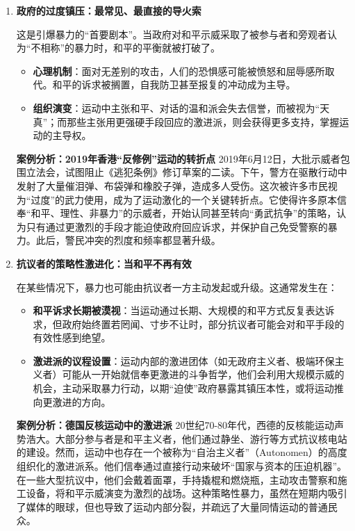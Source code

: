 \begin{enumerate}
    \item \textbf{政府的过度镇压：最常见、最直接的导火索}

    这是引爆暴力的“首要剧本”。当政府对和平示威采取了被参与者和旁观者认为“不相称”的暴力时，和平的平衡就被打破了。
    \begin{itemize}
        \item \textbf{心理机制}：面对无差别的攻击，人们的恐惧感可能被愤怒和屈辱感所取代。和平的诉求被搁置，自我防卫甚至报复的冲动成为主导。
        \item \textbf{组织演变}：运动中主张和平、对话的温和派会失去信誉，而被视为“天真”；而那些主张用更强硬手段回应的激进派，则会获得更多支持，掌握运动的主导权。
    \end{itemize}

    \textbf{案例分析：2019年香港“反修例”运动的转折点}
    2019年6月12日，大批示威者包围立法会，试图阻止《逃犯条例》修订草案的二读。下午，警方在驱散行动中发射了大量催泪弹、布袋弹和橡胶子弹，造成多人受伤。这次被许多市民视为“过度”的武力使用，成为了运动激化的一个关键转折点。它使得许多原本信奉“和平、理性、非暴力”的示威者，开始认同甚至转向“勇武抗争”的策略，认为只有通过更激烈的手段才能迫使政府回应诉求，并保护自己免受警察的暴力。此后，警民冲突的烈度和频率都显著升级。

    \item \textbf{抗议者的策略性激进化：当和平不再有效}

    在某些情况下，暴力也可能由抗议者一方主动发起或升级。这通常发生在：
    \begin{itemize}
        \item \textbf{和平诉求长期被漠视}：当运动通过长期、大规模的和平方式反复表达诉求，但政府始终置若罔闻、寸步不让时，部分抗议者可能会对和平手段的有效性感到绝望。
        \item \textbf{激进派的议程设置}：运动内部的激进团体（如无政府主义者、极端环保主义者）可能从一开始就信奉更激进的斗争哲学，他们会利用大规模示威的机会，主动采取暴力行动，以期“迫使”政府暴露其镇压本性，或将运动推向更激进的方向。
    \end{itemize}

    \textbf{案例分析：德国反核运动中的激进派}
    20世纪70-80年代，西德的反核能运动声势浩大。大部分参与者是和平主义者，他们通过静坐、游行等方式抗议核电站的建设。然而，运动中也存在一个被称为“自治主义者”（Autonomen）的高度组织化的激进派系。他们信奉通过直接行动来破坏“国家与资本的压迫机器”。在一些大型抗议中，他们会戴着面罩，手持撬棍和燃烧瓶，主动攻击警察和施工设备，将和平示威演变为激烈的战场。这种策略性暴力，虽然在短期内吸引了媒体的眼球，但也导致了运动内部分裂，并疏远了大量同情运动的普通民众。


\end{enumerate}
